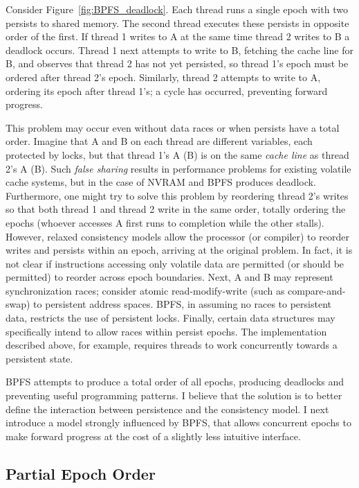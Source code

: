 Consider Figure~\ref{fig:BPFS_deadlock}.
Each thread runs a single epoch with two persists to shared memory.
The second thread executes these persists in opposite order of the first.
If thread 1 writes to A at the same time thread 2 writes to B a deadlock occurs.
Thread 1 next attempts to write to B, fetching the cache line for B, and observes that thread 2 has not yet persisted, so thread 1's epoch must be ordered after thread 2's epoch.
Similarly, thread 2 attempts to write to A, ordering its epoch after thread 1's; a cycle has occurred, preventing forward progress.

This problem may occur even without data races or when persists have a total order.
Imagine that A and B on each thread are different variables, each protected by locks, but that thread 1's A (B) is on the same \emph{cache line} as thread 2's A (B).
Such \emph{false sharing} results in performance problems for existing volatile cache systems, but in the case of NVRAM and BPFS produces deadlock.
Furthermore, one might try to solve this problem by reordering thread 2's writes so that both thread 1 and thread 2 write in the same order, totally ordering the epochs (whoever accesses A first runs to completion while the other stalls).
However, relaxed consistency models allow the processor (or compiler) to reorder writes and persists within an epoch, arriving at the original problem.
In fact, it is not clear if instructions accessing only volatile data are permitted (or should be permitted) to reorder across epoch boundaries.
Next, A and B may represent synchronization races; consider atomic read-modify-write (such as compare-and-swap) to persistent address spaces.
BPFS, in assuming no races to persistent data, restricts the use of persistent locks.
Finally, certain data structures may specifically intend to allow races within persist epochs.
The \GroupCommit implementation described above, for example, requires threads to work concurrently towards a persistent state.

BPFS attempts to produce a total order of all epochs, producing deadlocks and preventing useful programming patterns.
I believe that the solution is to better define the interaction between persistence and the consistency model.
I next introduce a model strongly influenced by BPFS, that allows concurrent epochs to make forward progress at the cost of a slightly less intuitive interface.

\subsection{Partial Epoch Order}
\label{sec:PMC:PersistenceModels:PEO}

